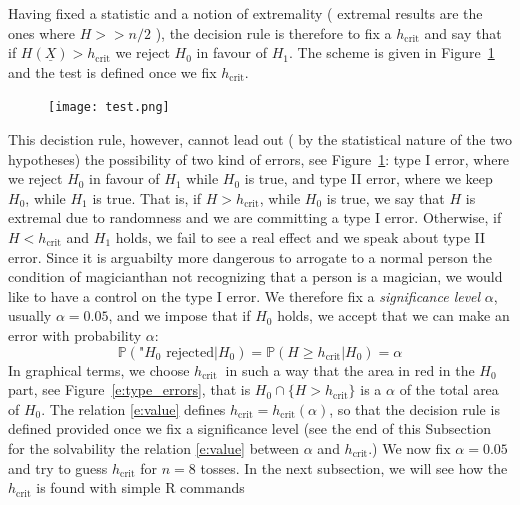 	Having fixed a statistic and a notion of extremality ( extremal results are the ones where $H>> n/2$ ), the decision rule is therefore to fix a $h_{\text{crit}}$ and say that if $H(\underline X ) > h_{\text{crit}}$ we reject $H_0$ in favour of $H_1$. The scheme is given in Figure~\ref{f:type_errors} and the test is defined once we fix $h_{\text{crit}}$. \\
	\begin{figure}[h]
			\texttt{[image: test.png]}
		\label{f:type_errors}
	\end{figure}
This decistion rule, however, cannot lead out ( by the statistical nature of the two hypotheses) the possibility of two kind of errors, see Figure~\ref{f:type_errors}: type I error, where we reject $H_0$ in favour of $H_1$ while $H_0$ is true, and type II error, where we keep $H_0$, while $H_1$ is true.
That is, if $H > h_{\text{crit}}$,  while $H_0$ is true, we say that $H$ is extremal due to randomness and we are committing a type I error. Otherwise, if $H < h_{\text{crit}}$ and $H_1$ holds, we fail to see a real effect and we speak about type II error. 
	Since it is arguabilty more dangerous to arrogate to a normal person the condition of magicianthan not recognizing that a person is a magician, we would like to have a control on the type I error. We therefore fix a \emph{significance level} $\alpha$, usually $\alpha = 0.05$, and we impose that if $H_0$ holds, we accept that we can make an error with probability $\alpha$: 
	\begin{equation}
		\label{e:value}
		\mathbb P( \text{"$H_0$ rejected}|H_0)  = \mathbb P( H \geq h_{\text{crit}} | H_0) = \alpha
	\end{equation}
	In graphical terms, we choose $h_{\text{crit }}$ in such a way that the area in red in the $H_0$ part, see Figure~\ref{e:type_errors}, that is $H_0 \cap \{ H > h_{\text{crit}}\}$ is a $\alpha$ of the total area of $H_0$. The relation \eqref{e:value} defines $h_{\text{crit}}  = h_{\text{crit}}(\alpha)$, so that the decision rule is defined provided once we fix a significance level (see the end of this Subsection for the solvability the relation \eqref{e:value} between $\alpha$ and $h_{\text{crit}}$.)  
	We now fix $\alpha = 0.05$ and try to guess $h_{\text{crit}}$ for $n = 8$ tosses.  In the next subsection, we will see how the $h_{\text{crit}}$ is found with simple R commands 
